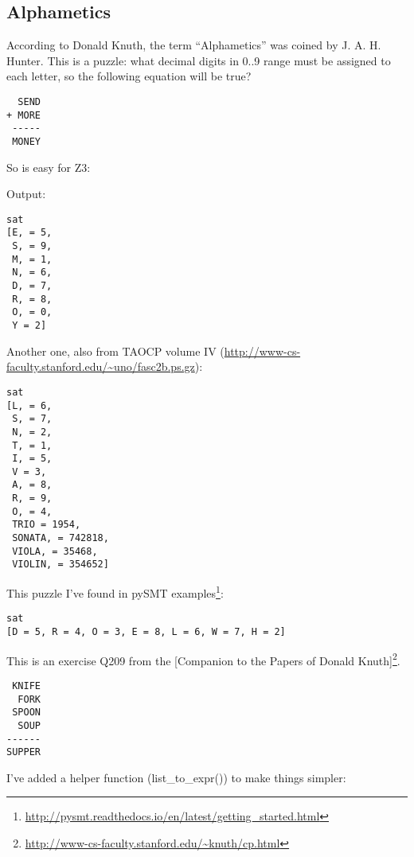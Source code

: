 \subsection{Alphametics}

According to Donald Knuth, the term ``Alphametics'' was coined by J. A. H. Hunter.
This is a puzzle: what decimal digits in 0..9 range must be assigned to each letter,
so the following equation will be true?

\begin{lstlisting}
  SEND
+ MORE
 -----
 MONEY
\end{lstlisting}

So is easy for Z3:



Output:

\begin{lstlisting}
sat
[E, = 5,
 S, = 9,
 M, = 1,
 N, = 6,
 D, = 7,
 R, = 8,
 O, = 0,
 Y = 2]
\end{lstlisting}

Another one, also from \ac{TAOCP} volume IV (\url{http://www-cs-faculty.stanford.edu/~uno/fasc2b.ps.gz}):



\begin{lstlisting}
sat
[L, = 6,
 S, = 7,
 N, = 2,
 T, = 1,
 I, = 5,
 V = 3,
 A, = 8,
 R, = 9,
 O, = 4,
 TRIO = 1954,
 SONATA, = 742818,
 VIOLA, = 35468,
 VIOLIN, = 354652]
\end{lstlisting}

This puzzle I've found in pySMT examples\footnote{\url{http://pysmt.readthedocs.io/en/latest/getting_started.html}}:



\begin{lstlisting}
sat
[D = 5, R = 4, O = 3, E = 8, L = 6, W = 7, H = 2]
\end{lstlisting}


This is an exercise Q209 from the 
[Companion to the Papers of Donald Knuth]\footnote{\url{http://www-cs-faculty.stanford.edu/~knuth/cp.html}}.

\begin{lstlisting}
 KNIFE
  FORK
 SPOON
  SOUP
------
SUPPER
\end{lstlisting}

I've added a helper function (list\_to\_expr()) to make things simpler:


